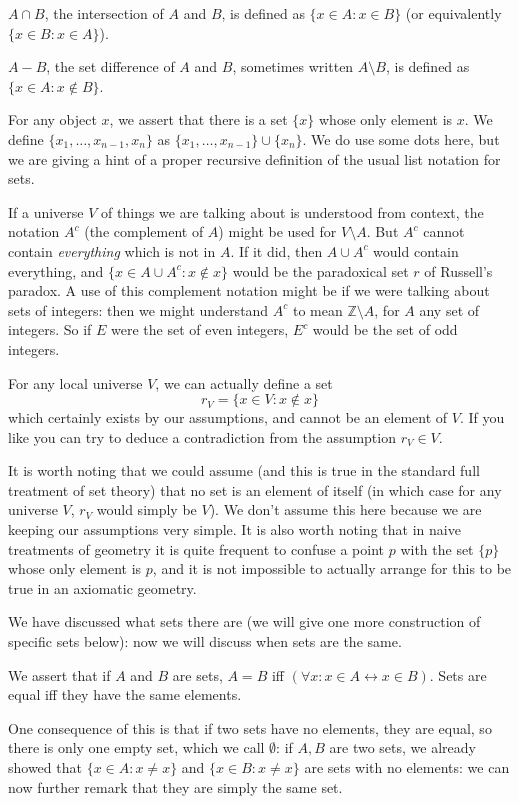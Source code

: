 \documentclass[12pt]{article}
\begin{document}
$A \cap B$, the intersection of $A$ and $B$, is defined as $\{x \in A: x \in B\}$ (or equivalently $\{x \in B:x \in A\}$).

$A - B$, the set difference of $A$ and $B$, sometimes written $A \setminus B$, is defined as
$\{x \in A:x \not\in B\}$.

For any object $x$, we assert that there is a set $\{x\}$ whose only element is $x$.  We define
$\{x_1,\ldots,x_{n-1},x_n\}$ as $\{x_1,\ldots,x_{n-1}\} \cup \{x_n\}$.  We do use some dots here, but we are giving a hint of a proper recursive definition of the usual list notation for sets.

If a universe $V$ of things we are talking about is understood from context, the notation
$A^c$ (the complement of $A$) might be used for $V \setminus A$.  But $A^c$ cannot contain {\em everything\/} which is not in $A$.  If it did, then $A \cup A^c$ would contain everything,
and $\{x \in A \cup A^c:x \not\in x\}$ would be the paradoxical set $r$ of Russell's paradox.
A use of this complement notation might be if we were talking about sets of integers:  then we might understand $A^c$ to mean $\mathbb Z \setminus A$, for $A$ any set of integers.  So if $E$ were the set of even integers, $E^c$ would be the set of odd integers.

For any local universe $V$, we can actually define a set $$r_V=\{x \in V:x \not\in x\}$$ which certainly exists by our assumptions, and cannot be an element of $V$.  If you like you can try to deduce a contradiction from the assumption $r_V \in V$.

It is worth noting that we could assume (and this is true in the standard full treatment of set theory) that no set is an element of itself (in which case for any universe $V$, $r_V$ would simply be $V$).  We don't assume this here because we are keeping our assumptions very simple.  It is also worth noting that in naive treatments of geometry it is quite frequent to confuse a point $p$ with the set $\{p\}$ whose only element is $p$, and it is not impossible to actually arrange for this to be true in an axiomatic geometry.

We have discussed what sets there are (we will give one more construction of specific sets below):  now we will discuss when sets are the same.

We assert that if $A$ and $B$ are sets, $A=B$ iff $(\forall x:x \in A \leftrightarrow x \in B)$.  Sets are equal iff they have the same elements.

One consequence of this is that if two sets have no elements, they are equal, so there is only one empty set, which we call $\emptyset$:  if $A, B$ are two sets, we already showed that $\{x \in A:x \neq x\}$ and $\{x \in B:x \neq x\}$ are sets with no elements:  we can now further remark that they are simply the same set.
\end{document}

